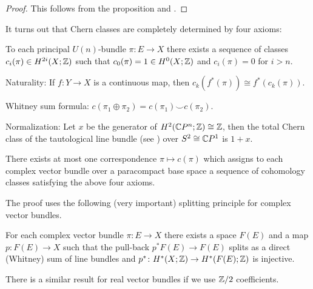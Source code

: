 \documentclass[ma3408.tex]{subfiles}
\begin{document}
\begin{proof}
This follows from the proposition and . 
\end{proof}
\begin{Rem}
It turns out that Chern classes are completely determined by four axioms:   
\end{Rem}
\begin{axioms}
    \item To each principal $U(n)$-bundle $\pi \colon E \to X$ there exists a sequence of classes $c_i(\pi) \in H^{2i}(X;\mathbb{Z})$ such that $c_0(\pi) = 1 \in H^0(X;\mathbb{Z})$ and $c_i(\pi) = 0$ for $i> n$. \label{a1-chern}
    \item Naturality: If $f \colon Y \to X$ is a continuous map, then $c_k(f^*(\pi)) \cong f^*(c_k(\pi))$.  \label{a2-chern}
    \item Whitney sum formula: $c(\pi_1\oplus\pi_2) = c(\pi_1) \smile c(\pi_2)$.  \label{a3-chern}
    \item Normalization: Let $x$ be the generator of $H^2(\mathbb{C} P^n;\mathbb{Z}) \cong \mathbb{Z}$, then the total Chern class of the tautological line bundle (see ) over $S^2 \cong \mathbb{C} P^1$ is $1+x$.\label{a4-chern}
    \end{axioms}
\begin{Thm}\label{thm:uniqueness-of-chern-classes}
There exists at most one correspondence $\pi \mapsto c(\pi)$ which assigns to each complex vector bundle over a paracompact base space a sequence of cohomology classes satisfying the above four axioms. 
\end{Thm}
The proof uses the following (very important) splitting principle for complex vector bundles.
\begin{Prop}\label{prop:splitting-principle-complex}
For each complex vector bundle $\pi \colon E \to X$ there exists a space $F(E)$ and a map $p \colon F(E) \to X$ such that the pull-back $p^*F(E) \to F(E)$ splits as a direct (Whitney) sum of line bundles and $p^* \colon H^*(X;\mathbb{Z}) \to H^*(F(E);\mathbb{Z})$ is injective. 
\end{Prop}
\begin{Rem}
There is a similar result for real vector bundles if we use $\mathbb{Z}/2$ coefficients. 
\end{Rem}
\end{document}
